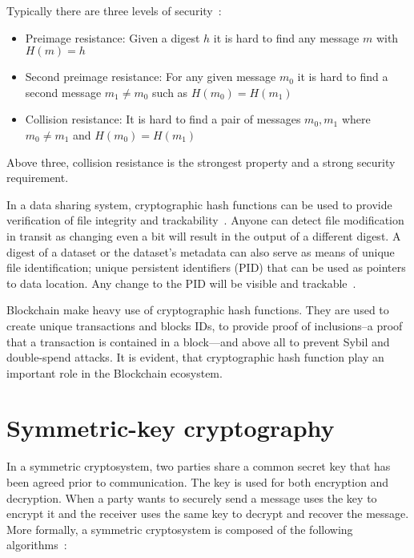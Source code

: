 Typically there are three levels of security~\cite{Katz:2014:IMC:2700550}:

\begin{itemize}
  \item Preimage resistance: Given a digest $h$ it is hard to find any message $m$ with $H(m) = h$
  \item Second preimage resistance: For any given message $m_0$ it is hard to find a second message $m_1 \neq m_0$ such as $H(m_0) = H(m_1)$
  \item Collision resistance: It is hard to find a pair of messages $m_0, m_1$ where $m_0 \neq m_1$ and $H(m_0) = H(m_1)$
\end{itemize}

Above three, collision resistance is the strongest property and a strong security requirement.

In a data sharing system, cryptographic hash functions can be used to provide verification of file integrity and trackability~\cite{10.1109/SPW.2015.27, Azaria2016}. Anyone can detect file modification in transit as changing even a bit will result in the output of a different digest. A digest of a dataset or the dataset's metadata can also serve as means of unique file identification; unique persistent identifiers (PID) that can be used as pointers to data location. Any change to the PID will be visible and trackable~\cite{dist_pid}.

Blockchain make heavy use of cryptographic hash functions. They are used to create unique transactions and blocks IDs, to provide proof of inclusions--a proof that a transaction is contained in a block---and above all to prevent Sybil and double-spend attacks. It is evident, that cryptographic hash function play an important role in the Blockchain ecosystem.

\section{Symmetric-key cryptography}
\label{preliminaries:sym}

In a symmetric cryptosystem, two parties share a common secret key that has been agreed prior to communication. The key is used for both encryption and decryption. When a party wants to securely send a message uses the key to encrypt it and the receiver uses the same key to decrypt and recover the message. More formally, a symmetric cryptosystem is composed of the following algorithms~\cite{Katz:2014:IMC:2700550, kiagias:crypto}:

